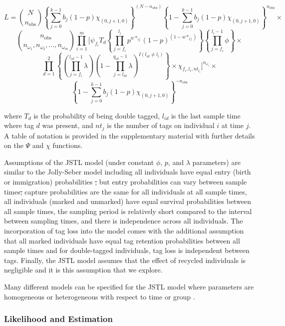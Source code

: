 \documentclass[12pt]{article}
\providecommand{\DIFaddtex}[1]{{\protect\color{blue}\uwave{#1}}} %
\providecommand{\DIFdeltex}[1]{{\protect\color{red}\sout{#1}}}                      %
\providecommand{\DIFaddbegin}{} %
\providecommand{\DIFaddend}{} %
\providecommand{\DIFdelbegin}{} %
\providecommand{\DIFdelend}{} %
\providecommand{\DIFadd}[1]{\texorpdfstring{\DIFaddtex{#1}}{#1}} %
\providecommand{\DIFdel}[1]{\texorpdfstring{\DIFdeltex{#1}}{}} %
\newcommand{\DIFscaledelfig}{0.5}
\newlength{\DIFdelgraphicswidth} %
\newlength{\DIFdelgraphicsheight} %
\newcommand{\DIFaddincludegraphics}[2][]{{\color{blue}\fbox{\DIFOincludegraphics[#1]{#2}}}} %
\newcommand{\DIFdelincludegraphics}[2][]{%
\sbox{\DIFdelgraphicsbox}{\DIFOincludegraphics[#1]{#2}}%
\settoboxwidth{\DIFdelgraphicswidth}{\DIFdelgraphicsbox} %
\settoboxtotalheight{\DIFdelgraphicsheight}{\DIFdelgraphicsbox} %
\scalebox{\DIFscaledelfig}{%
\parbox[b]{\DIFdelgraphicswidth}{\usebox{\DIFdelgraphicsbox}\\[-\baselineskip] \rule{\DIFdelgraphicswidth}{0em}}\llap{\resizebox{\DIFdelgraphicswidth}{\DIFdelgraphicsheight}{%
\setlength{\unitlength}{\DIFdelgraphicswidth}%
\begin{picture}(1,1)%
\thicklines\linethickness{2pt} %
{\color[rgb]{1,0,0}\put(0,0){\framebox(1,1){}}}%
{\color[rgb]{1,0,0}\put(0,0){\line( 1,1){1}}}%
{\color[rgb]{1,0,0}\put(0,1){\line(1,-1){1}}}%
\end{picture}%
}\hspace*{3pt}}} %
} %
\DeclareRobustCommand{\DIFaddbegin}{\DIFOaddbegin \let\includegraphics\DIFaddincludegraphics} %
\DeclareRobustCommand{\DIFaddend}{\DIFOaddend \let\includegraphics\DIFOincludegraphics} %
\DeclareRobustCommand{\DIFdelbegin}{\DIFOdelbegin \let\includegraphics\DIFdelincludegraphics} %
\DeclareRobustCommand{\DIFdelend}{\DIFOaddend \let\includegraphics\DIFOincludegraphics} %
\begin{document}
\[
L=\binom{N}{n_\text{obs}} \left\{ \sum_{j=0}^{k-1} b_j(1-p)\chi_{(0,j+1,0)} \right\} ^{(N-n_\text{obs})} \left\{ 1- \sum_{j=0}^{k-1} b_j(1-p)\chi_{(0,j+1,0)} \right\} ^{n_\text{obs}} \times
\] \[
\binom{n_\text{obs}}{n_{\omega_1},n_{\omega_2},...,n_{\omega_m}} \prod_{i=1}^{m} \Bigg[ \psi_{f_i} T_d \left\{ \prod_{j=f_i}^{l_i} p^{w*_{ij}} (1-p)^{(1-w*_{ij})} \right\} \left\{ \prod_{j=f_i}^{l_i-1} \phi \right\} \times 
\] \[
\prod_{d=1}^{2} \left\{ \left( \prod_{j=f_i}^{l_{id}-1} \lambda \right) \left(1-\prod_{j=l_{id}}^{q_{id}-1} \lambda \right)^{I(l_{id} \neq l_i)} \right\} \times \chi_{f_i, l_i, nt_{l_i}} \Bigg]^{n_{\omega_i}} \times 
\] \[
\left\{ 1- \sum_{j=0}^{k-1} b_j(1-p)\chi_{(0,j+1,0)} \right\} ^{-n_\text{obs}}
\] 

\noindent where $T_d$ is the probability of being double tagged, $l_{id}$ is the last sample time where tag $d$ was present, and $nt_{j}$ is the number of tags on individual $i$ at time $j$.  A table of notation is provided in the supplementary material with further details on the $\Psi$ and $\chi$ functions.

Assumptions of the JSTL model (under constant $\phi$, $p$, and $\lambda$ parameters) are similar to the Jolly-Seber model \citep{Schwarz:1996} including all individuals have equal entry (birth or immigration) probabilities \DIFdelbegin \DIFdel{,
  }\DIFdelend but entry probabilities can vary between sample times\DIFdelbegin \DIFdel{;  }\DIFdelend \DIFaddbegin \DIFadd{, }\DIFaddend capture probabilities are the same for all individuals at all sample times,  all individuals (marked and unmarked) have equal survival
  probabilities between all sample times, the sampling period is relatively short compared to the interval between sampling times, and there is independence across all individuals.  The incorporation of tag loss into the model comes with the additional assumption that all marked individuals have equal tag retention probabilities between all sample times and for double-tagged individuals, tag loss is independent between tags.  Finally, the JSTL model assumes that the effect of recycled individuals is negligible and it is this assumption that we explore. 

Many different models can be specified for the JSTL model where parameters are homogeneous or heterogeneous with respect to time \citep{Cowen:2006} or group  \citep{Xu:2014}. 


\subsubsection{Likelihood and
Estimation}\label{likelihood-and-estimation}
\end{document}
